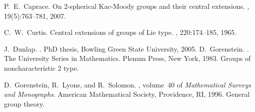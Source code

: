 \documentclass[12pt]{amsart}
\theoremstyle{definition}
\begin{document}
\begin{thebibliography}{10}

%
P.~E.~Caprace.
\newblock On 2-spherical {K}ac-{M}oody groups and their central extensions.
, 19(5):763--781, 2007.


C.~W.~Curtis.
\newblock Central extensions of groups of {L}ie type.
, 220:174--185, 1965.


J.~Dunlap.
.
\newblock PhD thesis, Bowling Green State University, 2005.
%
%
%
%
D.~Gorenstein.
.
\newblock The University Series in Mathematics. Plenum Press, New York, 1983.
\newblock Groups of noncharacteristic $2$ type.

D.~Gorenstein, R.~Lyons, and R.~Solomon.
, volume~40 of {\em Mathematical Surveys and
  Monographs}.
\newblock American Mathematical Society, Providence, RI, 1996.
\newblock General group theory.


\end{thebibliography}
\end{document}
